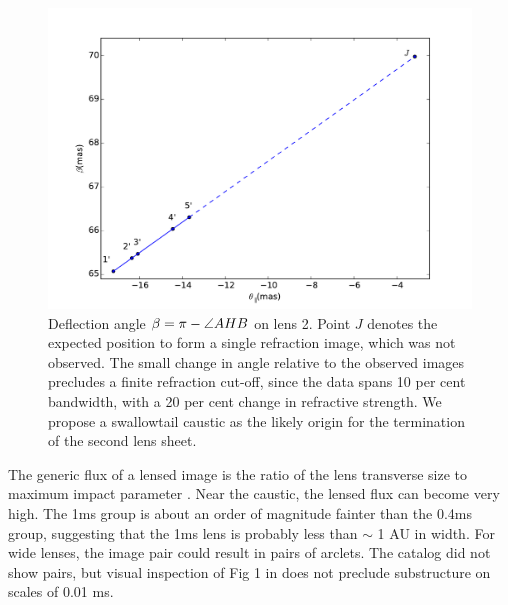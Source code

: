 \documentclass[useAMS,usenatbib]{mn2e}
\begin{document}
\begin{figure}
\centering
\includegraphics[width=1.0\linewidth]{Reflection_angle.pdf}
\caption{Deflection angle $\beta=\pi-\protect\angle AHB$ on lens 2.  Point $J$ denotes the expected position to form a single refraction image, which was not
  observed.   The small change in angle relative to the observed
  images precludes a finite refraction cut-off, since the data spans
  10 per cent bandwidth, with a 20 per cent change in refractive strength.  We
  propose a swallowtail caustic as the likely origin for the
  termination of the second lens sheet.
}
\label{vtrans}
\end{figure}

The generic flux of a lensed image is the ratio of the lens transverse
size to maximum impact parameter \citep{2012MNRAS.421L.132P}.  Near
the caustic, the lensed flux can become very high.  The 1ms group is
about an order of magnitude fainter than the 0.4ms group, suggesting
that the 1ms lens is probably less than $\sim$ 1 AU in width.  
For wide lenses, the image pair could result in pairs of arclets.  The
catalog did not show pairs, but visual inspection of Fig 1 in
\citet{2010ApJ...708..232B} does not preclude substructure on scales
of 0.01 ms.
\end{document}

